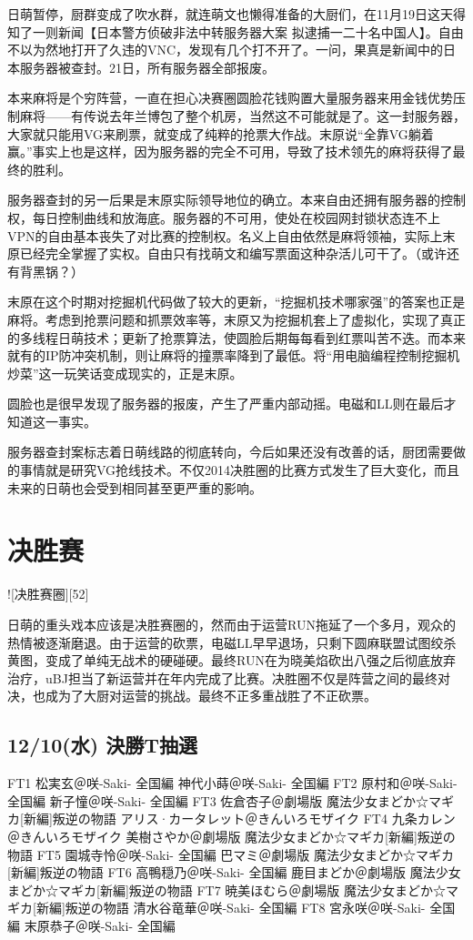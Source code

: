 日萌暂停，厨群变成了吹水群，就连萌文也懒得准备的大厨们，在11月19日这天得知了一则新闻【日本警方侦破非法中转服务器大案 拟逮捕一二十名中国人】。自由不以为然地打开了久违的VNC，发现有几个打不开了。一问，果真是新闻中的日本服务器被查封。21日，所有服务器全部报废。

本来麻将是个穷阵营，一直在担心决赛圈圆脸花钱购置大量服务器来用金钱优势压制麻将——有传说去年兰博包了整个机房，当然这不可能就是了。这一封服务器，大家就只能用VG来刷票，就变成了纯粹的抢票大作战。末原说“全靠VG躺着赢。”事实上也是这样，因为服务器的完全不可用，导致了技术领先的麻将获得了最终的胜利。

服务器查封的另一后果是末原实际领导地位的确立。本来自由还拥有服务器的控制权，每日控制曲线和放海底。服务器的不可用，使处在校园网封锁状态连不上VPN的自由基本丧失了对比赛的控制权。名义上自由依然是麻将领袖，实际上末原已经完全掌握了实权。自由只有找萌文和编写票面这种杂活儿可干了。（或许还有背黑锅？）

末原在这个时期对挖掘机代码做了较大的更新，“挖掘机技术哪家强”的答案也正是麻将。考虑到抢票问题和抓票效率等，末原又为挖掘机套上了虚拟化，实现了真正的多线程日萌技术；更新了抢票算法，使圆脸后期每每看到红票叫苦不迭。而本来就有的IP防冲突机制，则让麻将的撞票率降到了最低。将“用电脑编程控制挖掘机炒菜”这一玩笑话变成现实的，正是末原。

圆脸也是很早发现了服务器的报废，产生了严重内部动摇。电磁和LL则在最后才知道这一事实。

服务器查封案标志着日萌线路的彻底转向，今后如果还没有改善的话，厨团需要做的事情就是研究VG抢线技术。不仅2014决胜圈的比赛方式发生了巨大变化，而且未来的日萌也会受到相同甚至更严重的影响。

\section{决胜赛}

![决胜赛圈][52]

日萌的重头戏本应该是决胜赛圈的，然而由于运营RUN拖延了一个多月，观众的热情被逐渐磨退。由于运营的砍票，电磁LL早早退场，只剩下圆麻联盟试图绞杀黄图，变成了单纯无战术的硬碰硬。最终RUN在为晓美焰砍出八强之后彻底放弃治疗，uBJ担当了新运营并在年内完成了比赛。决胜圈不仅是阵营之间的最终对决，也成为了大厨对运营的挑战。最终不正多重战胜了不正砍票。

\subsection{12/10(水) 決勝T抽選}

    FT1 松実玄＠咲-Saki- 全国編 神代小蒔＠咲-Saki- 全国編
    FT2 原村和＠咲-Saki- 全国編  新子憧＠咲-Saki- 全国編
    FT3 佐倉杏子＠劇場版 魔法少女まどか☆マギカ[新編]叛逆の物語  アリス·カータレット＠きんいろモザイク
    FT4 九条カレン＠きんいろモザイク  美樹さやか＠劇場版 魔法少女まどか☆マギカ[新編]叛逆の物語
    FT5 園城寺怜＠咲-Saki- 全国編  巴マミ＠劇場版 魔法少女まどか☆マギカ[新編]叛逆の物語
    FT6 高鴨穏乃＠咲-Saki- 全国編  鹿目まどか＠劇場版 魔法少女まどか☆マギカ[新編]叛逆の物語
    FT7 暁美ほむら＠劇場版 魔法少女まどか☆マギカ[新編]叛逆の物語  清水谷竜華＠咲-Saki- 全国編
    FT8 宮永咲＠咲-Saki- 全国編  末原恭子＠咲-Saki- 全国編

